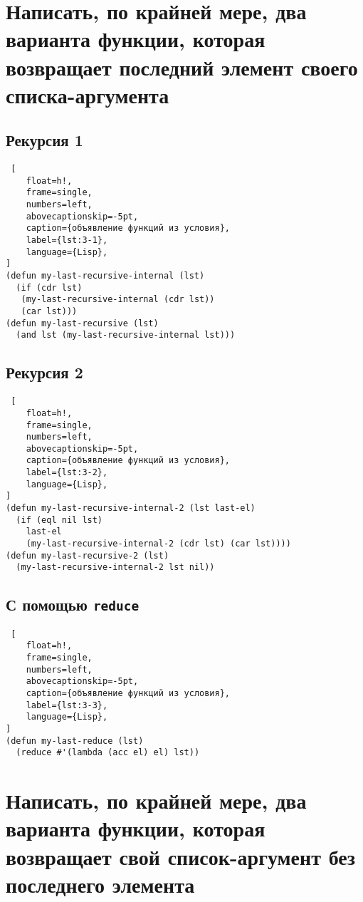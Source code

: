 \section{Написать, по крайней мере, два варианта функции, которая возвращает последний элемент своего списка-аргумента}

\subsection{Рекурсия 1}

\begin{lstlisting} [
	float=h!,
	frame=single,
	numbers=left,
	abovecaptionskip=-5pt,
	caption={объявление функций из условия},
	label={lst:3-1},
	language={Lisp},
]
(defun my-last-recursive-internal (lst)
  (if (cdr lst) 
   (my-last-recursive-internal (cdr lst))
   (car lst)))
(defun my-last-recursive (lst)
  (and lst (my-last-recursive-internal lst)))
\end{lstlisting}

\subsection{Рекурсия 2}

\begin{lstlisting} [
	float=h!,
	frame=single,
	numbers=left,
	abovecaptionskip=-5pt,
	caption={объявление функций из условия},
	label={lst:3-2},
	language={Lisp},
]
(defun my-last-recursive-internal-2 (lst last-el)
  (if (eql nil lst) 
    last-el 
    (my-last-recursive-internal-2 (cdr lst) (car lst))))
(defun my-last-recursive-2 (lst)
  (my-last-recursive-internal-2 lst nil))
\end{lstlisting}

\subsection{С помощью \texttt{reduce}}

\begin{lstlisting} [
	float=h!,
	frame=single,
	numbers=left,
	abovecaptionskip=-5pt,
	caption={объявление функций из условия},
	label={lst:3-3},
	language={Lisp},
]
(defun my-last-reduce (lst)
  (reduce #'(lambda (acc el) el) lst))
\end{lstlisting}

\clearpage

\section{Написать, по крайней мере, два варианта функции, которая возвращает свой список-аргумент без последнего элемента}

